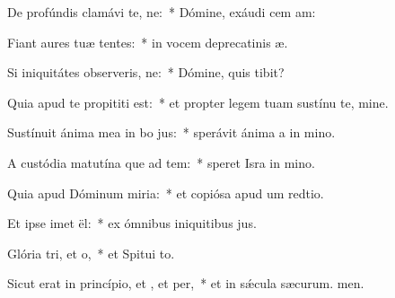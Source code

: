 \item De profúndis clamávi  te, ne:~* Dómine, exáudi cem am:
\item Fiant aures tuæ tentes:~* in vocem deprecatinis æ.
\item Si iniquitátes observeris, ne:~* Dómine, quis tibit?
\item Quia apud te propititi est:~* et propter legem tuam sustínu te, mine.
\item Sustínuit ánima mea in bo jus:~* sperávit ánima a in mino.
\item A custódia matutína que ad tem:~* speret Isra in mino.
\item Quia apud Dóminum miria:~* et copiósa apud um redtio.
\item Et ipse imet ël:~* ex ómnibus iniquitibus jus.
\item Glória tri, et o,~* et Spitui to.
\item Sicut erat in princípio, et , et per,~* et in sǽcula sæcurum. men.
